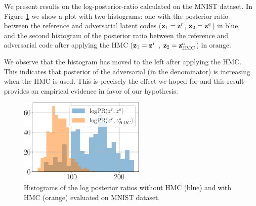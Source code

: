 We present results on the log-posterior-ratio calculated on the MNIST dataset. In Figure \ref{fig:mnist_post_ratio} we show a plot with two histograms: one with the posterior ratio between the reference and adversarial latent codes (${\mathbf{z}}_1 = {\mathbf{z}}^r$,  ${\mathbf{z}}_2 = {\mathbf{z}}^a$) in blue, and the second histogram of the posterior ratio between the reference and adversarial code after applying the HMC (${\mathbf{z}}_1 = {\mathbf{z}}^r$ , ${\mathbf{z}}_2 = {\mathbf{z}}^a_{\text{HMC}}$) in orange. 



We observe that the histogram has moved to the left after applying the HMC. This indicates that posterior of the adversarial (in the denominator) is increasing when the HMC is used. This is precisely the effect we hoped for and this result provides an empirical evidence in favor of our hypothesis.

\begin{figure}[ht]
    \centering
        \includegraphics[width=0.55\textwidth]{pics/3_adv_att/mnist_posterior_ratio.pdf}
    \caption{Histograms of the log posterior ratios without HMC (blue) and with HMC (orange) evaluated on MNIST dataset.}
    \label{fig:mnist_post_ratio}
\end{figure}



